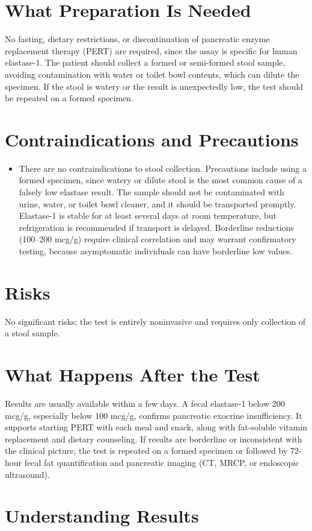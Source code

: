 \section*{What Preparation Is Needed}
No fasting, dietary restrictions, or discontinuation of pancreatic enzyme replacement therapy (PERT) are required, since the assay is specific for human elastase-1. The patient should collect a formed or semi-formed stool sample, avoiding contamination with water or toilet bowl contents, which can dilute the specimen. If the stool is watery or the result is unexpectedly low, the test should be repeated on a formed specimen.
\section*{Contraindications and Precautions}
\begin{itemize}
  \item There are no contraindications to stool collection. Precautions include using a formed specimen, since watery or dilute stool is the most common cause of a falsely low elastase result. The sample should not be contaminated with urine, water, or toilet bowl cleaner, and it should be transported promptly. Elastase-1 is stable for at least several days at room temperature, but refrigeration is recommended if transport is delayed. Borderline reductions (100--200 mcg/g) require clinical correlation and may warrant confirmatory testing, because asymptomatic individuals can have borderline low values.
\end{itemize}
\section*{Risks}
No significant risks; the test is entirely noninvasive and requires only collection of a stool sample.
\section*{What Happens After the Test}
Results are usually available within a few days. A fecal elastase-1 below 200 mcg/g, especially below 100 mcg/g, confirms pancreatic exocrine insufficiency. It supports starting PERT with each meal and snack, along with fat-soluble vitamin replacement and dietary counseling. If results are borderline or inconsistent with the clinical picture, the test is repeated on a formed specimen or followed by 72-hour fecal fat quantification and pancreatic imaging (CT, MRCP, or endoscopic ultrasound).
\section*{Understanding Results}
